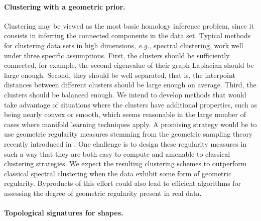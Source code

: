 \paragraph{Clustering with a geometric prior.} 
Clustering may be viewed as the most basic homology inference problem, since it consists in inferring the connected components in the data set. Typical methods for clustering data sets in high dimensions, {\it e.g.,} spectral clustering, work well under three specific assumptions. First, the clusters should be sufficiently connected, for example, the second eigenvalue of their graph Laplacian should be large enough. Second, they should be well separated, that is, the interpoint distances between different clusters should be large enough on average. Third, the clusters should be balanced enough. We intend to develop methods that would take advantage of situations where the clusters have additional properties, such as being nearly convex or smooth, which seems reasonable in the large number of cases where manifold learning techniques apply. A promising strategy would be to use geometric regularity measures stemming from the geometric sampling theory recently introduced in \cite{geometrica-ccl09}. One challenge is to design these regularity measures in such a way that they are both easy to compute and amenable to classical clustering strategies. We expect the resulting clustering schemes to outperform classical spectral clustering when the data exhibit some form of geometric regularity. Byproducts of this effort could also lead to efficient algorithms for assessing the degree of geometric regularity present in real data. 



\paragraph{Topological signatures for shapes.}


